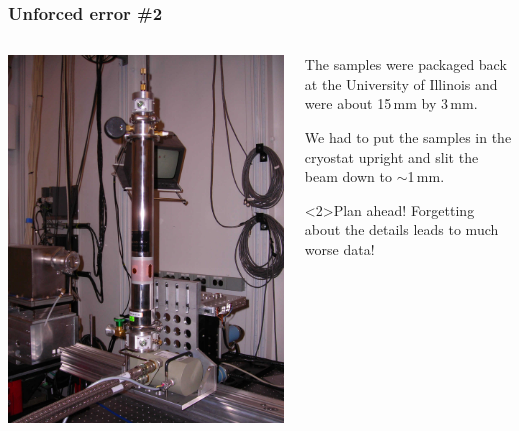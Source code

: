 \documentclass[10pt, xcolor=x11names, compress]{beamer}
\begin{document}
\begin{frame}
  \frametitle{Unforced error \#2}
  \begin{columns}
    \begin{column}{0.5\linewidth}
      \includegraphics[width=0.8\linewidth]{images/displex.jpg}
    \end{column}
    \begin{column}{0.5\linewidth}
      The samples were packaged back at the University of Illinois and
      were about 15\,mm by 3\,mm.

      \bigskip

      We had to put the samples in the cryostat upright and slit the
      beam down to $\sim$1\,mm.

      \bigskip

      \begin{alertblock}<2>{Plan ahead!}
        Forgetting about the details leads to much worse data!
      \end{alertblock}
    \end{column}
  \end{columns}
\end{frame}
\end{document}
